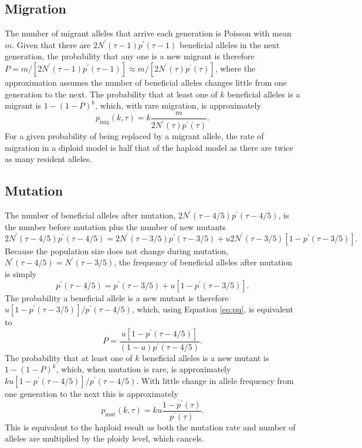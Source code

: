 \documentclass[]{article}
\begin{document}
\subsection*{Migration}
%
The number of migrant alleles that arrive each generation is Poisson with mean $m$. 
Given that there are $2N^\prime(\tau-1)p^\prime(\tau-1)$ beneficial alleles in the next generation, the probability that any one is a new migrant is therefore $P = m/[2N^\prime(\tau-1)p^\prime(\tau-1)]\approx m/[2N^\prime(\tau)p^\prime(\tau)]$, where the approximation assumes the number of beneficial alleles changes little from one generation to the next.
The probability that at least one of $k$ beneficial alleles is a migrant is $1-(1-P)^k$, which, with rare migration, is approximately 
\begin{equation}
p_\mathrm{mig}(k,\tau) = k \frac{m}{2N^\prime(\tau)p^\prime(\tau)}.
\end{equation}
For a given probability of being replaced by a migrant allele, the rate of migration in a diploid model is half that of the haploid model \citep[equation 15 in][replacing $M$ with $m$]{pennings2006soft2} as there are twice as many resident alleles.
%
\subsection*{Mutation}
%
The number of beneficial alleles after mutation, $2N^\prime(\tau-4/5)p^\prime(\tau-4/5)$, is the number before mutation plus the number of new mutants
\begin{equation}
2N^\prime(\tau-4/5)p^\prime(\tau-4/5) = 2N^\prime(\tau-3/5)p^\prime(\tau-3/5) + u 2N^\prime(\tau-3/5)[1-p^\prime(\tau-3/5)].
\end{equation}
Because the population size does not change during mutation, $N^\prime(\tau-4/5)=N^\prime(\tau-3/5)$, the frequency of beneficial alleles after mutation is simply
\begin{equation}\label{eq:pu}
p^\prime(\tau-4/5) = p^\prime(\tau-3/5) + u [1-p^\prime(\tau-3/5)].
\end{equation}
The probability a beneficial allele is a new mutant is therefore $u [1-p^\prime(\tau-3/5)]/p^\prime(\tau-4/5)$, which, using Equation \ref{eq:pu}, is equivalent to
\begin{equation}
P = \frac{u [1-p^\prime(\tau-4/5)]}{(1-u)p^\prime(\tau-4/5)}.
\end{equation}
The probability that at least one of $k$ beneficial alleles is a new mutant is $1-(1-P)^k$, which, when mutation is rare, is approximately $k u [1-p^\prime(\tau-4/5)]/p^\prime(\tau-4/5)$.
With little change in allele frequency from one generation to the next this is approximately
\begin{equation}
p_\mathrm{mut}(k,\tau) = k u \frac{1-p^\prime(\tau)}{p^\prime(\tau)}.
\end{equation}
This is equivalent to the haploid result \citep[e.g., equation 5 in][]{pennings2006soft2} as both the mutation rate and number of alleles are multiplied by the ploidy level, which cancels.
%
\end{document}
